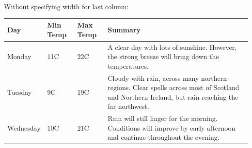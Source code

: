 \documentclass{article}
\begin{document}
	Without specifying width for last column:
	\begin{center}
	    \begin{tabular}{| l | l | l | l |}
	    \hline
	    Day & Min Temp & Max Temp & Summary \\ \hline
	    Monday & 11C & 22C & A clear day with lots of sunshine.
	    However, the strong breeze will bring down the temperatures. \\ \hline
	    Tuesday & 9C & 19C & Cloudy with rain, across many northern regions. Clear spells 
	    across most of Scotland and Northern Ireland, 
	    but rain reaching the far northwest. \\ \hline
	    Wednesday & 10C & 21C & Rain will still linger for the morning. 
	    Conditions will improve by early afternoon and continue 
	    throughout the evening. \\
	    \hline
	    \end{tabular}
	\end{center}
	
\end{document}
